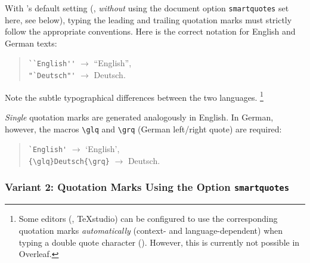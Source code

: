 With \latex's default setting (\ie, \emph{without} using the document option
\texttt{smartquotes} set here, see below), typing the leading and trailing
quotation marks must strictly follow the appropriate conventions. Here is the
correct \latex notation for English and German texts:
%
\begin{quote}
    \verb!``English''! $\rightarrow$ ``English'',\\
    \verb!"`Deutsch"'! $\rightarrow$ {\glqq}Deutsch{\grqq}.
\end{quote}
%
Note the subtle typographical differences between the two languages.%
\footnote{Some editors (\eg, \textsf{TeXstudio}) can be configured to use the
corresponding quotation marks \emph{automatically} (context- and
language-dependent) when typing a double quote character
(\texttt{\textquotedbl}). However, this is currently not possible in
\textsf{Overleaf}.}

\emph{Single} quotation marks are generated analogously in English. In German,
however, the macros \verb!\glq! and \verb!\grq! (German left/right quote) are
required:
%
\begin{quote}
    \verb!`English'! $\rightarrow$ `English',\\
    \verb!{\glq}Deutsch{\grq}! $\rightarrow$ {\glq}Deutsch{\grq}.
\end{quote}

\subsubsection{Variant 2: Quotation Marks Using the Option \texttt{smartquotes}}


